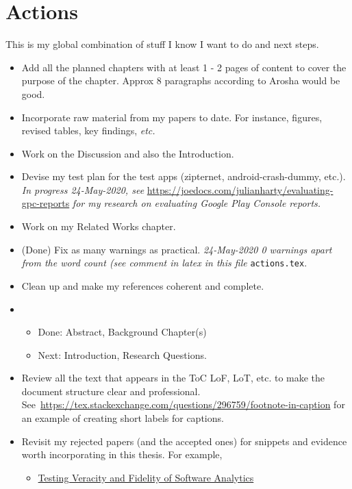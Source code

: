 \section{Actions}
\label{meta-chapter-actions}
This is my global combination of stuff I know I want to do and next steps.
\begin{itemize}
    \item Add all the planned chapters with at least 1 - 2 pages of content to cover the purpose of the chapter. Approx 8 paragraphs according to Arosha would be good.
    \item Incorporate raw material from my papers to date. For instance, figures, revised tables, key findings, \emph{etc.}
    \item Work on the Discussion and also the Introduction.
    \item Devise my test plan for the test apps (zipternet, android-crash-dummy, etc.). \emph{In progress 24-May-2020, see} \url{https://joedocs.com/julianharty/evaluating-gpc-reports} \emph{for my research on evaluating Google Play Console reports.}
    \item Work on my Related Works chapter.
    \item (Done) Fix as many warnings as practical. \emph{24-May-2020 0 warnings apart from the word count (see comment in latex in this file} \texttt{actions.tex}.
    \item Clean up and make my references coherent and complete.
    \item {}
    \begin{itemize}
        \item Done: Abstract, Background Chapter(s)
        \item Next: Introduction, Research Questions.
    \end{itemize}
    \item Review all the text that appears in the ToC LoF, LoT, etc. to make the document structure clear and professional. See~\url{https://tex.stackexchange.com/questions/296759/footnote-in-caption} for an example of creating short labels for captions.
    \item Revisit my rejected papers (and the accepted ones) for snippets and evidence worth incorporating in this thesis. For example,
    \begin{itemize}
        \item \href{https://www.overleaf.com/4666349717jtgjwrkchfkh}{Testing Veracity and Fidelity of Software Analytics}
    \end{itemize}

\end{itemize}

